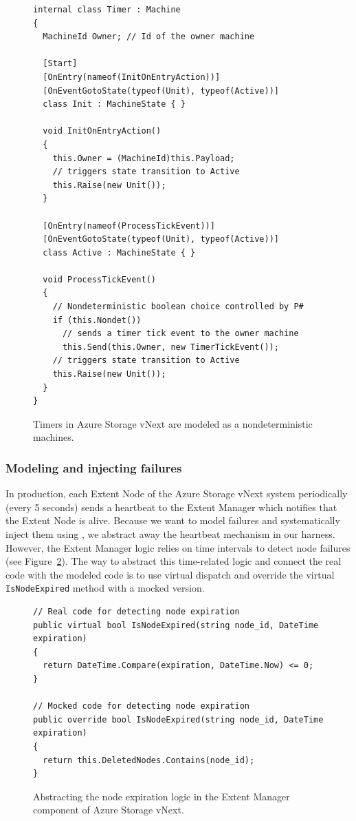 \begin{figure}[t]
\begin{lstlisting}
internal class Timer : Machine
{
  MachineId Owner; // Id of the owner machine

  [Start]
  [OnEntry(nameof(InitOnEntryAction))]
  [OnEventGotoState(typeof(Unit), typeof(Active))]
  class Init : MachineState { }

  void InitOnEntryAction()
  {
    this.Owner = (MachineId)this.Payload;
    // triggers state transition to Active
    this.Raise(new Unit());
  }

  [OnEntry(nameof(ProcessTickEvent))]
  [OnEventGotoState(typeof(Unit), typeof(Active))]
  class Active : MachineState { }

  void ProcessTickEvent()
  {
    // Nondeterministic boolean choice controlled by P#
    if (this.Nondet())
      // sends a timer tick event to the owner machine
      this.Send(this.Owner, new TimerTickEvent());
    // triggers state transition to Active
    this.Raise(new Unit());
  }
}
\end{lstlisting}
\vspace{-2mm}
\caption{Timers in Azure Storage vNext are modeled as a nondeterministic \psharp machines.}
\label{fig:timer}
\end{figure}

\subsubsection{Modeling and injecting failures}
\label{sec:method:model:failures}

In production, each Extent Node of the Azure Storage vNext system periodically (every 5 seconds) sends a heartbeat to the Extent Manager which notifies that the Extent Node is alive. Because we want to model failures and systematically inject them using \psharp, we abstract away the heartbeat mechanism in our harness. However, the Extent Manager logic relies on time intervals to detect node failures (see Figure~\ref{fig:expiration}). The way to abstract this time-related logic and connect the real code with the modeled code is to use virtual dispatch and override the virtual \texttt{IsNodeExpired} method with a mocked version.

\begin{figure}[t]
\begin{lstlisting}
// Real code for detecting node expiration
public virtual bool IsNodeExpired(string node_id, DateTime expiration)
{
  return DateTime.Compare(expiration, DateTime.Now) <= 0;
}

// Mocked code for detecting node expiration
public override bool IsNodeExpired(string node_id, DateTime expiration)
{
  return this.DeletedNodes.Contains(node_id);
}
\end{lstlisting}
\vspace{-2mm}
\caption{Abstracting the node expiration logic in the Extent Manager component of Azure Storage vNext.}
\label{fig:expiration}
\end{figure}


